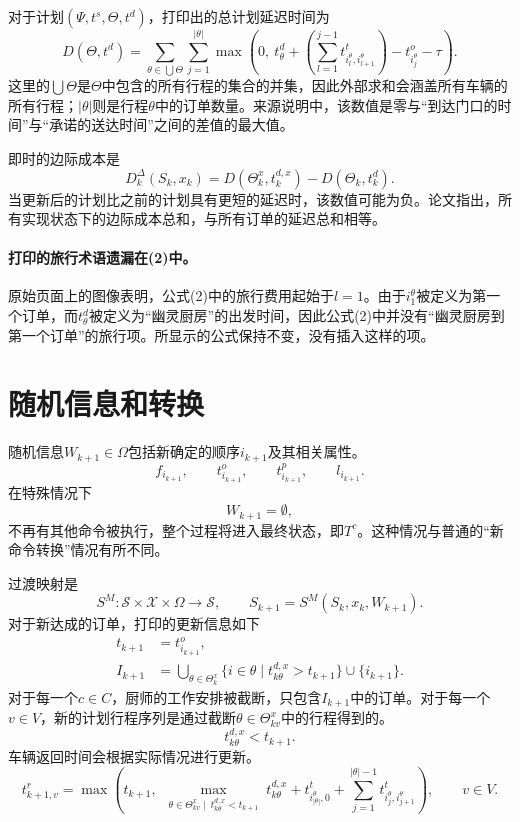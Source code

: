 \documentclass{article}
\begin{document}
对于计划\((\Psi,t^s,\Theta,t^d)\)，打印出的总计划延迟时间为
\begin{equation}
D(\Theta,t^d)
=
\sum_{\theta\in\bigcup\Theta}
\sum_{j=1}^{|\theta|}
\max\left(
0,\ t^d_\theta+
\left(\sum_{l=1}^{j-1}t^t_{i^\theta_l,i^\theta_{l+1}}\right)
-t^o_{i^\theta_j}-\tau
\right).
\tag{2}
\end{equation}
这里的\(\bigcup\Theta\)是\(\Theta\)中包含的所有行程的集合的并集，因此外部求和会涵盖所有车辆的所有行程；\(|\theta|\)则是行程\(\theta\)中的订单数量。来源说明中，该数值是零与“到达门口的时间”与“承诺的送达时间”之间的差值的最大值。

即时的边际成本是
\begin{equation}
D^\Delta_k(S_k,x_k)
=D(\Theta^x_k,t^{d,x}_k)-D(\Theta_k,t^d_k).
\tag{3}
\end{equation}
当更新后的计划比之前的计划具有更短的延迟时，该数值可能为负。论文指出，所有实现状态下的边际成本总和，与所有订单的延迟总和相等。

\paragraph{打印的旅行术语遗漏在(2)中。}
原始页面上的图像表明，公式(2)中的旅行费用起始于\(l=1\)。由于\(i^\theta_1\)被定义为第一个订单，而\(t^d_\theta\)被定义为“幽灵厨房”的出发时间，因此公式(2)中并没有“幽灵厨房到第一个订单”的旅行项。所显示的公式保持不变，没有插入这样的项。

\section*{随机信息和转换}

随机信息\(W_{k+1}\in\Omega\)包括新确定的顺序\(i_{k+1}\)及其相关属性。
\[
f_{i_{k+1}},\qquad t^o_{i_{k+1}},\qquad
 t^p_{i_{k+1}},\qquad l_{i_{k+1}}.
\]
在特殊情况下
\[
W_{k+1}=\emptyset,
\]
不再有其他命令被执行，整个过程将进入最终状态，即\(T^c\)。这种情况与普通的“新命令转换”情况有所不同。

过渡映射是
\[
S^M:\mathcal{S}\times\mathcal{X}\times\Omega\longrightarrow\mathcal{S},
\qquad
S_{k+1}=S^M(S_k,x_k,W_{k+1}).
\]
对于新达成的订单，打印的更新信息如下
\begin{align*}
t_{k+1}&=t^o_{i_{k+1}},\\
I_{k+1}&=
\bigcup_{\theta\in\Theta^x_k}
\{i\in\theta\mid t^{d,x}_{k\theta}>t_{k+1}\}
\cup\{i_{k+1}\}.
\end{align*}
对于每一个\(c\in C\)，厨师的工作安排被截断，只包含\(I_{k+1}\)中的订单。对于每一个\(v\in V\)，新的计划行程序列是通过截断\(\theta\in\Theta^x_{kv}\)中的行程得到的。
\[
t^{d,x}_{k\theta}<t_{k+1}.
\]
车辆返回时间会根据实际情况进行更新。
\begin{equation}
t^r_{k+1,v}
=\max\left(
 t_{k+1},\
 \max_{\substack{\theta\in\Theta^x_{kv}\mid\ t^{d,x}_{k\theta}<t_{k+1}}}
 t^{d,x}_{k\theta}
 +t^t_{i^\theta_{|\theta|},0}
 +\sum_{j=1}^{|\theta|-1}t^t_{i^\theta_j,i^\theta_{j+1}}
\right),\qquad v\in V.
\tag{4}
\end{equation}
\end{document}
